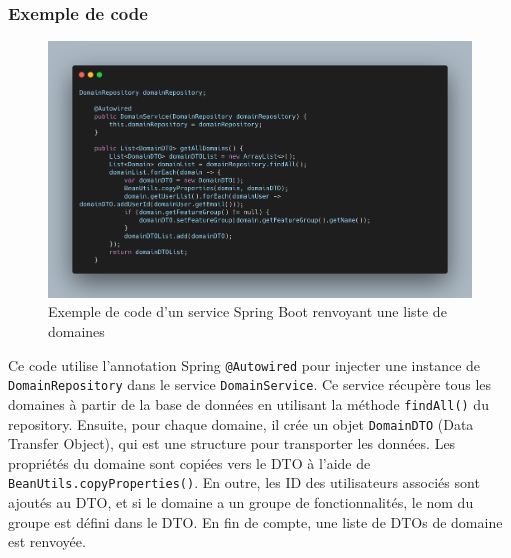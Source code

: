 \documentclass[a4paper, 11pt]{report}
\begin{document}
\subsubsection{Exemple de code}
  \begin{figure}[H]
      \centering
      \includegraphics[scale=0.45,center]{screenshots/java-code}
      \caption{Exemple de code d'un service Spring Boot renvoyant une liste de domaines}
  \end{figure}
Ce code utilise l'annotation Spring \texttt{@Autowired} pour injecter une instance
de \texttt{DomainRepository} dans le service \texttt{DomainService}. Ce
service récupère tous les domaines à partir de la base de données en
utilisant la méthode \texttt{findAll()} du repository. Ensuite, pour
chaque domaine, il crée un objet \texttt{DomainDTO} (Data Transfer
Object), qui est une structure pour transporter les données. Les
propriétés du domaine sont copiées vers le DTO à l'aide de
\texttt{BeanUtils.copyProperties()}. En outre, les ID des utilisateurs
associés sont ajoutés au DTO, et si le domaine a un groupe de
fonctionnalités, le nom du groupe est défini dans le DTO. En fin de
compte, une liste de DTOs de domaine est renvoyée.
\end{document}
